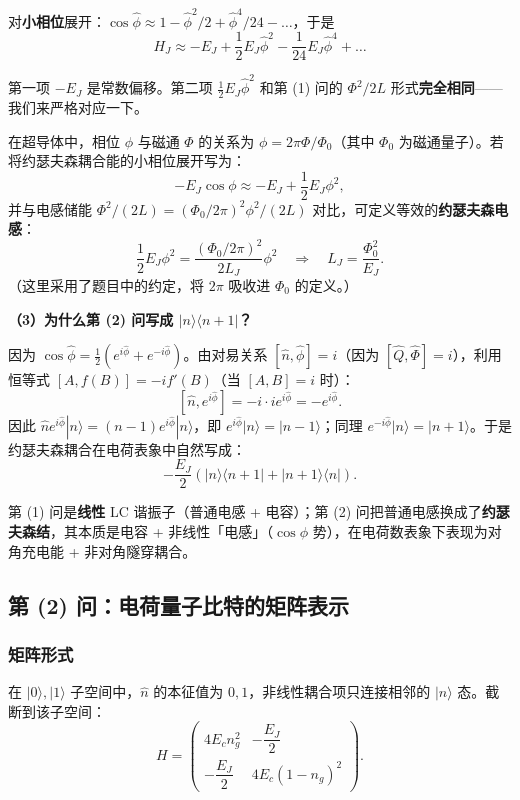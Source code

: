 对\textbf{小相位}展开：$\cos\hat{\phi} \approx 1 - \hat{\phi}^2/2 + \hat{\phi}^4/24 - \dots$，于是
\[
H_J \approx -E_J + \frac{1}{2}E_J\hat{\phi}^2 - \frac{1}{24}E_J\hat{\phi}^4 + \dots
\]

第一项 $-E_J$ 是常数偏移。第二项 $\frac{1}{2}E_J\hat{\phi}^2$ 和第 (1) 问的 $\Phi^2/2L$ 形式\textbf{完全相同}——我们来严格对应一下。

在超导体中，相位 $\phi$ 与磁通 $\Phi$ 的关系为 $\phi = 2\pi\Phi/\Phi_0$（其中 $\Phi_0$ 为磁通量子）。若将约瑟夫森耦合能的小相位展开写为：
\[
-E_J\cos\phi \approx -E_J + \frac{1}{2}E_J\phi^2,
\]
并与电感储能 $\Phi^2/(2L) = (\Phi_0/2\pi)^2 \phi^2/(2L)$ 对比，可定义等效的\textbf{约瑟夫森电感}：
\[
\frac{1}{2}E_J\phi^2 = \frac{(\Phi_0/2\pi)^2}{2L_J}\phi^2 \quad \Rightarrow \quad L_J = \frac{\Phi_0^2}{E_J}.
\]
（这里采用了题目中的约定，将 $2\pi$ 吸收进 $\Phi_0$ 的定义。）

\textbf{（3）为什么第 (2) 问写成 $|n\rangle\langle n+1|$？}

因为 $\cos\hat{\phi} = \frac{1}{2}(e^{i\hat{\phi}} + e^{-i\hat{\phi}})$。由对易关系 $[\hat{n}, \hat{\phi}] = i$（因为 $[\hat{Q}, \hat{\Phi}] = i$），利用恒等式 $[A, f(B)] = -i f'(B)$（当 $[A,B]=i$ 时）：
\[
[\hat{n}, e^{i\hat{\phi}}] = -i \cdot i e^{i\hat{\phi}} = -e^{i\hat{\phi}}.
\]
因此 $\hat{n} e^{i\hat{\phi}}|n\rangle = (n-1)e^{i\hat{\phi}}|n\rangle$，即 $e^{i\hat{\phi}}|n\rangle = |n-1\rangle$；同理 $e^{-i\hat{\phi}}|n\rangle = |n+1\rangle$。于是约瑟夫森耦合在电荷表象中自然写成：
\[
-\frac{E_J}{2}(|n\rangle\langle n+1| + |n+1\rangle\langle n|).
\]

\begin{tipbox}[一句话总结]
第 (1) 问是\textbf{线性} LC 谐振子（普通电感 + 电容）；第 (2) 问把普通电感换成了\textbf{约瑟夫森结}，其本质是电容 + 非线性「电感」（$\cos\phi$ 势），在电荷数表象下表现为对角充电能 + 非对角隧穿耦合。
\end{tipbox}

\subsection{第 (2) 问：电荷量子比特的矩阵表示}

\subsubsection{矩阵形式}

在 $|0\rangle, |1\rangle$ 子空间中，$\hat{n}$ 的本征值为 $0, 1$，非线性耦合项只连接相邻的 $|n\rangle$ 态。截断到该子空间：
\[
H = \begin{pmatrix}
4E_c n_g^2 & -\dfrac{E_J}{2} \\[8pt]
-\dfrac{E_J}{2} & 4E_c(1-n_g)^2
\end{pmatrix}.
\]

